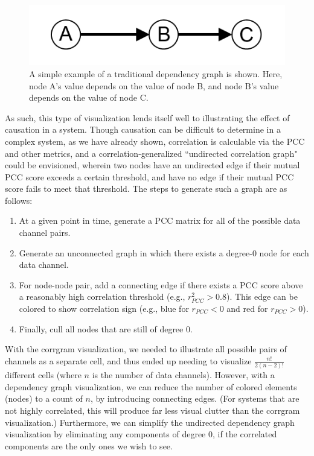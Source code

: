 \begin{figure}[h]
\centering
    \includegraphics{images/dependency_graph_example.png}
    \caption{A simple example of a traditional dependency graph is shown. Here, node A's value depends on the value of node B, and node B's value depends on the value of node C.}
    \label{fig:dependency_graph_example}
\end{figure}

As such, this type of visualization lends itself well to illustrating the effect of causation in a system. Though causation can be difficult to determine in a complex system, as we have already shown, correlation is calculable via the PCC and other metrics, and a correlation-generalized ``undirected correlation graph" could be envisioned, wherein two nodes have an undirected edge if their mutual PCC score exceeds a certain threshold, and have no edge if their mutual PCC score fails to meet that threshold. The steps to generate such a graph are as follows:

\begin{enumerate}
    \item At a given point in time, generate a PCC matrix for all of the possible data channel pairs.
    \item Generate an unconnected graph in which there exists a degree-0 node for each data channel.
    \item For node-node pair, add a connecting edge if there exists a PCC score above a reasonably high correlation threshold (e.g., $r_{PCC}^{2} > 0.8$). This edge can be colored to show correlation sign (e.g., blue for $r_{PCC} < 0$ and red for $r_{PCC} > 0$).
    \item Finally, cull all nodes that are still of degree 0.
\end{enumerate}

With the corrgram visualization, we needed to illustrate all possible pairs of channels as a separate cell, and thus ended up needing to visualize $\frac{n!}{2 (n - 2)!}$ different cells (where $n$ is the number of data channels). However, with a dependency graph visualization, we can reduce the number of colored elements (nodes) to a count of $n$, by introducing connecting edges. (For systems that are not highly correlated, this will produce far less visual clutter than the corrgram visualization.) Furthermore, we can simplify the undirected dependency graph visualization by eliminating any components of degree 0, if the correlated components are the only ones we wish to see.

